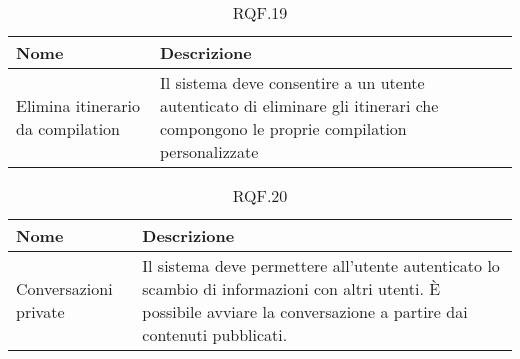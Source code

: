 \documentclass{natourDoc}
\begin{document}
	\begin{table}[H]
		\centering
		\begin{tabular}{ |p{5cm}|p{10.3cm}| }
			\hline
			\rowcolor{PineGreen!70}
			\textbf{Nome} & \textbf{Descrizione} \\
			\hline
			Elimina itinerario da compilation & Il sistema deve consentire a un utente autenticato di eliminare gli itinerari
			che compongono le proprie compilation personalizzate \\
			\hline
		\end{tabular}
		\caption{RQF.19}
		\label{table:19}
	\end{table}

	\begin{table}[H]
		\centering
		\begin{tabular}{ |p{5cm}|p{10.3cm}| }
			\hline
			\rowcolor{PineGreen!70}
			\textbf{Nome} & \textbf{Descrizione} \\
			\hline
			Conversazioni private & Il sistema deve permettere all'utente autenticato lo scambio di informazioni con altri utenti.
			È possibile avviare la conversazione a partire dai contenuti pubblicati. \\
			\hline
		\end{tabular}
		\caption{RQF.20}
		\label{table:20}
	\end{table}
\end{document}
